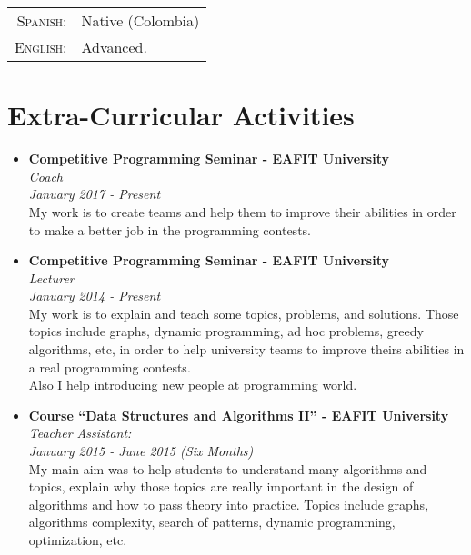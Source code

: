 \documentclass[a4paper,10pt]{article} %
\begin{document}
\begin{tabular}{rl}
\textsc{Spanish:} & Native (Colombia)\\
\textsc{English:} & Advanced.\\
\end{tabular}


\section{Extra-Curricular Activities}
\begin{itemize}
\item \textbf{Competitive Programming Seminar - EAFIT University}\\
\textit{Coach}\\
\textit{January 2017 - Present}\\
 My work is to create teams and help them to improve their abilities in order to make a better job in the programming contests.\\ \linebreak \linebreak \linebreak
\item \textbf{Competitive Programming Seminar - EAFIT University}\\
\textit{Lecturer}\\
\textit{January 2014 - Present}\\
My work is to explain and teach some topics, problems, and solutions. Those topics include graphs, dynamic programming, ad hoc problems, greedy algorithms, etc, in order to help university teams to improve theirs abilities in a real programming contests.\\
Also I help introducing new people at programming world.
\item \textbf{Course ``Data Structures and Algorithms II'' - EAFIT University}\\
\textit{Teacher Assistant:}\\
\textit{January 2015 - June 2015 (Six Months)}\\
My main aim was to help students to understand many algorithms and topics, explain why those topics are really important in the design of algorithms and how to pass theory into practice. Topics include graphs, algorithms complexity, search of patterns, dynamic programming, optimization, etc.\\
\end{itemize}
\end{document}
